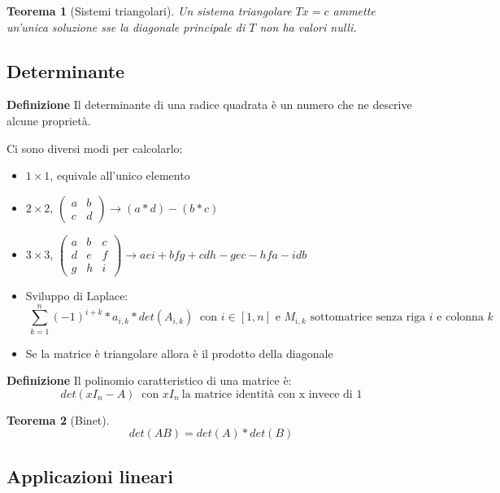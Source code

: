 \documentclass{article}
\newtheorem{theorem}{Teorema}
\begin{document}
\begin{theorem}[Sistemi triangolari]
    Un sistema triangolare $Tx=c$ ammette un'unica soluzione sse la diagonale principale di $T$ non ha valori nulli.\newline
\end{theorem}

\subsection{Determinante}

\textbf{Definizione} Il determinante di una radice quadrata è un numero che ne descrive alcune proprietà.\newline

\noindent Ci sono diversi modi per calcolarlo:
\begin{itemize}
    \item $1\times 1$, equivale all'unico elemento
    \item $2\times2$, $\begin{pmatrix}
        a & b\\ c & d
    \end{pmatrix}\rightarrow(a*d)-(b*c)$
    \item $3\times3$, $\begin{pmatrix}
        a & b & c\\ d & e & f\\ g & h & i
    \end{pmatrix}\rightarrow aei+bfg+cdh-gec-hfa-idb$
    \item Sviluppo di Laplace:
    $$\ \sum^n_{k=1}(-1)^{i+k}*a_{i,k}*det(A_{i,k})\ \text{ con $i\in[1,n]$ e $M_{i,k}$ sottomatrice senza riga $i$ e colonna $k$}$$
    \item Se la matrice è triangolare allora è il prodotto della diagonale\newline
\end{itemize}

\noindent\textbf{Definizione} Il polinomio caratteristico di una matrice è:
$$det(xI_n-A)\ \text{ con $xI_n\ $la matrice identità con x invece di 1}$$\newline

\begin{theorem}[Binet]
    $$det(AB)=det(A)*det(B)$$
\end{theorem}

\subsection{Applicazioni lineari}
\end{document}
